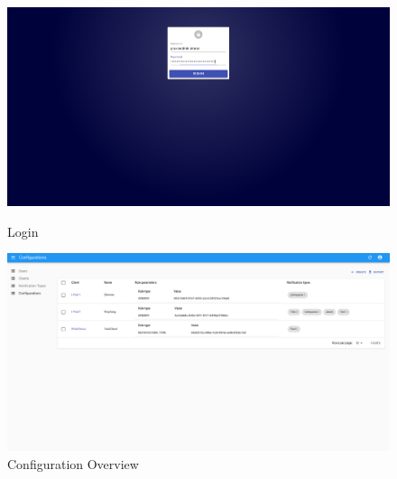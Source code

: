 \begin{figure}[h]
    \centering
    \begin{minipage}[b]{0.4\textwidth}
        \includegraphics[width=\textwidth]{graphics/screenshots/adminui/login}
        \caption{Login}
    \end{minipage}
    \hfill
    \begin{minipage}[b]{0.4\textwidth}
        \includegraphics[width=\textwidth]{graphics/screenshots/adminui/configuration-all}
        \caption{Configuration Overview}
    \end{minipage}
    \label{fig:AdminUI-Screens1}
\end{figure}

